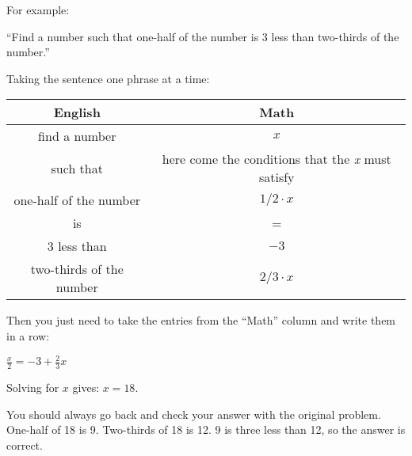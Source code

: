 \documentclass[fleqn]{article}
\begin{document}
For example:

``Find a number such that one-half of the number is 3 less than two-thirds of the number.''

Taking the sentence one phrase at a time:

\begin{tabular}{|c|c|}
\hline
  English       & Math \\
\hline
  find a number & $x$ \\
  such that     & here come the conditions that the {\em x} must satisfy \\
  one-half of the number & $1/2 \cdot x$ \\
  is & =  \\
  3 less than & $-3$ \\
  two-thirds of the number & $2/3 \cdot x$ \\
\hline
\end{tabular}

\vspace{.5 cm}

Then you just need to take the entries from the ``Math'' column and write them in a row:

\( \displaystyle \frac{x}{2} = -3 + \frac{2}{3} x \)

Solving for $x$ gives: $x = 18$.

You should always go back and check your answer with the original problem.  One-half of 18 is 9.  Two-thirds of 18 is
12.  9 is three less than 12, so the answer is correct.
\end{document}
